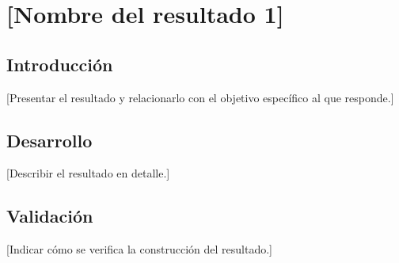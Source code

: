 
\chapter{[Nombre del resultado 1]}
\label{ch:result-01}

\section{Introducción}
[Presentar el resultado y relacionarlo con el objetivo específico
al que responde.]

\section{Desarrollo}
[Describir el resultado en detalle.]

\section{Validación}
[Indicar cómo se verifica la construcción del resultado.]
